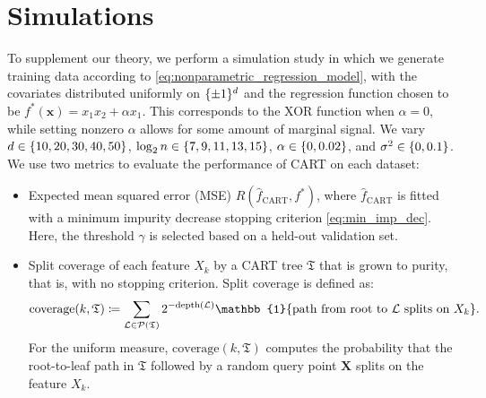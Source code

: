 \documentclass[11pt]{article}
\newcommand{\bx}{\mathbf{x}}
\newcommand{\bX}{\mathbf{X}}
\DeclarePairedDelimiter{\braces}{\lbrace}{\rbrace}
\newcommand{\indicator}{\mathbb{1}}
\newcommand{\tree}{\mathfrak{T}}
\newcommand{\leaf}{\mathcal{L}}
\newcommand{\partition}{\mathcal{P}}
\newcommand{\fcart}{\hat{f}_{\operatorname{CART}}}
\newcommand{\comment}[2]{{#2}}
\begin{document}




\section{Simulations}
\label{sec:simulations}

To supplement our theory, we perform a simulation study in which we generate training data according to \eqref{eq:nonparametric_regression_model}, with the covariates distributed uniformly on $\braces{\pm 1}^d$ and the regression function chosen to be $f^*(\bx) = x_1x_2 + \alpha x_1$.
This corresponds to the XOR function when $\alpha = 0$, while setting nonzero $\alpha$ allows for some amount of marginal signal.
We vary $d \in \braces{10, 20, 30, 40, 50}$, $\log_2 n \in \braces{7,9,11,13,15}$, $\alpha \in \braces{0, 0.02}$, and $\sigma^2 \in \braces{0, 0.1}$.
We use two metrics to evaluate the performance of CART on each dataset:
\begin{itemize}
    \item Expected mean squared error (MSE) $R(\fcart, f^*)$, where $\fcart$ is fitted with a minimum impurity decrease stopping criterion \eqref{eq:min_imp_dec}. Here, the threshold $\gamma$ is selected based on a held-out validation set.
    \item Split coverage of each feature $X_k$ by a CART tree $\tree$ that is grown to purity, that is, with no stopping criterion.
    Split coverage is defined as:
    \begin{equation} \label{eq:coverage}
    \text{coverage}(k,\tree) \coloneqq \sum_{\leaf \in \partition(\tree)} 2^{-\text{depth}(\leaf)}\indicator\braces*{\text{path from root to}~\leaf~\text{splits on}~X_k}.
\end{equation}
For the uniform measure, $\text{coverage}(k,\tree)$ computes the probability that the root-to-leaf path in $\tree$ followed by a random query point $\bX$ splits on the feature $X_k$.
\end{itemize}
\end{document}
